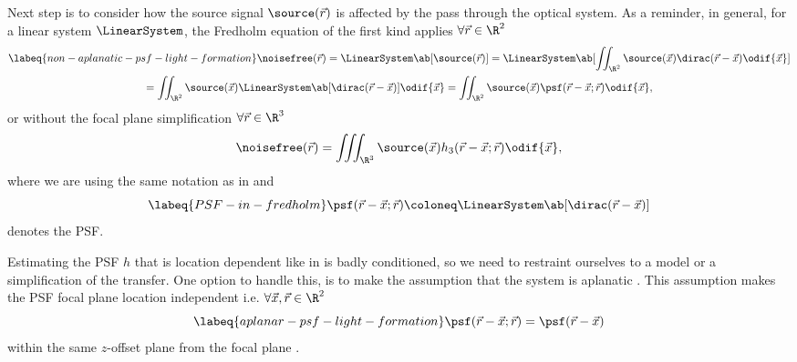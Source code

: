 Next step is to consider how the source signal \(\source(\vec{r})\) is affected by the pass through the optical system.
As a reminder, in general, for a linear system \(\LinearSystem\), the Fredholm equation of the first kind applies \(\forall \vec{r}
    \in \R^2\)
    \begin{multline} \labeq{non-aplanatic-psf-light-formation}
        \noisefree(\vec{r}) = \LinearSystem\ab[\source(\vec{r})] = \LinearSystem\ab[\iint_{\R^2} \source(\vec{x}) \dirac(\vec{r} - \vec{x})
        \odif{\vec{x}}]  \\
            = \iint_{\R^2} \source(\vec{x}) \LinearSystem\ab[\dirac(\vec{r} - \vec{x})] \odif{\vec{x}} = \iint_{\R^2} \source(\vec{x}) \psf(\vec{r} -\vec{x}; \vec{r}) \odif{\vec{x}},
    \end{multline}
    or without the focal plane simplification \(\forall\vec{r} \in \R^3\)
    \begin{equation*}
        \noisefree(\vec{r}) = \iiint_{\R^3} \source(\vec{x}) h_3(\vec{r} - \vec{x}; \vec{r}) \odif{\vec{x}},
    \end{equation*}
    where we are using the same notation as in  and
    \begin{equation*} \labeq{PSF-in-fredholm}
        \psf(\vec{r} - \vec{x}; \vec{r}) \coloneq \LinearSystem\ab[\dirac(\vec{r} - \vec{x})]
    \end{equation*}
    denotes the \ac{PSF}.

Estimating the \ac{PSF} \(h\) that is location dependent like in  is badly
    conditioned, so we need to restraint ourselves to a model or a simplification of the transfer.
One option to handle this, is to make the assumption that the system is aplanatic%
.
This assumption makes the \ac{PSF} focal plane location independent i.e. \(\forall\vec{x},\vec{r} \in \R^2\)
    \begin{equation*} \labeq{aplanar-psf-light-formation}
        \psf(\vec{r} - \vec{x}; \vec{r}) = \psf(\vec{r} - \vec{x})
    \end{equation*}
     within the same \(z\)-offset plane from the focal plane%
.

